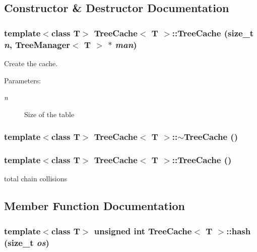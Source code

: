 \subsection{Constructor \& Destructor Documentation}
\subsubsection{\setlength{\rightskip}{0pt plus 5cm}template$<$class T$>$ {\bf Tree\-Cache}$<$ T $>$::{\bf Tree\-Cache} (size\_\-t {\em n}, {\bf Tree\-Manager}$<$ T $>$ $\ast$ {\em man})}\label{classTreeCache_a0}


Create the cache. 

\begin{Desc}
\item[Parameters:]
\begin{description}
\item[{\em n}]Size of the table \end{description}
\end{Desc}
\subsubsection{\setlength{\rightskip}{0pt plus 5cm}template$<$class T$>$ {\bf Tree\-Cache}$<$ T $>$::$\sim${\bf Tree\-Cache} ()}\label{classTreeCache_a1}


\subsubsection{\setlength{\rightskip}{0pt plus 5cm}template$<$class T$>$ {\bf Tree\-Cache}$<$ T $>$::{\bf Tree\-Cache} ()\hspace{0.3cm}{\tt  [private]}}\label{classTreeCache_d0}


total chain collisions 



\subsection{Member Function Documentation}
\subsubsection{\setlength{\rightskip}{0pt plus 5cm}template$<$class T$>$ unsigned int {\bf Tree\-Cache}$<$ T $>$::hash (size\_\-t {\em os})\hspace{0.3cm}{\tt  [inline, protected]}}\label{classTreeCache_b0}



